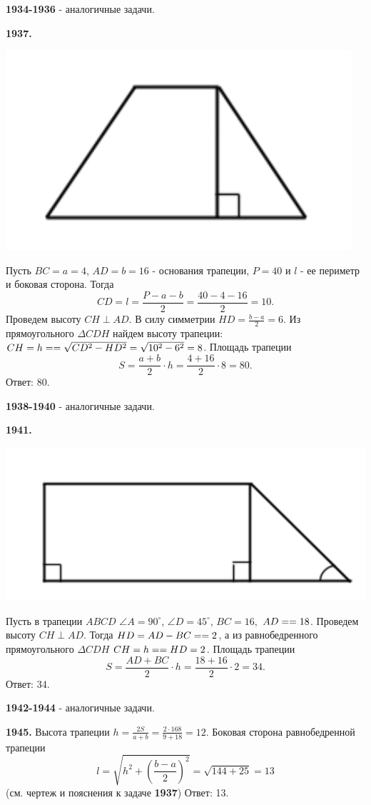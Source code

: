 \textbf{1934-1936} - аналогичные задачи.

\textbf{1937.}

{\centering \includegraphics[width=0.45\linewidth]{Geometry/Content/28.png}
	
}

Пусть $BC = a = 4$, $AD = b = 16$ - основания трапеции, $P=40$ и $l$ - ее периметр и боковая сторона. Тогда
\[
CD = l = \frac{P-a-b}{2} = \frac{40-4-16}{2} = 10.
\]
Проведем высоту $CH \perp AD$. В силу симметрии $HD = \frac{b - a}{2} = 6$. Из прямоугольного $\Delta CDH$ найдем высоту трапеции: $CH = h =\linebreak= \sqrt{CD^2-HD^2} = \sqrt{10^2-6^2} = 8$. Площадь трапеции
\[
S = \frac{a+b}{2}\cdot h = \frac{4 + 16}{2} \cdot 8 = 80.
\] \null \hspace*{\fill} Ответ: 80.

\textbf{1938-1940} - аналогичные задачи.

\textbf{1941.}

{\centering \includegraphics[width=0.45\linewidth]{Geometry/Content/29.png}
	
}

Пусть в трапеции $ABCD$ $\angle A = 90^\circ$, $\angle D = 45^\circ$, $BC = 16,$ $AD = \linebreak=18$. Проведем высоту $CH \perp AD$. Тогда $HD = AD - BC = \linebreak = 2$, а из равнобедренного прямоугольного $\Delta CDH$ $CH = h = \linebreak = HD = 2$. Площадь трапеции
\[
S = \frac{AD + BC}{2}\cdot h = \frac{18+16}{2}\cdot2=34.
\] \null \hspace*{\fill} Ответ: 34.

\textbf{1942-1944} - аналогичные задачи.

\textbf{1945.} Высота трапеции $h = \frac{2S}{a+b} = \frac{2 \cdot 168}{9+18} = 12$. Боковая сторона равнобедренной трапеции
\[
l = \sqrt{h^2+\left( \frac{b-a}{2} \right)^2} = \sqrt{144 + 25} =13
\]  (см. чертеж и пояснения к задаче \textbf{1937})\newline \null \hspace*{\fill} Ответ: 13.

